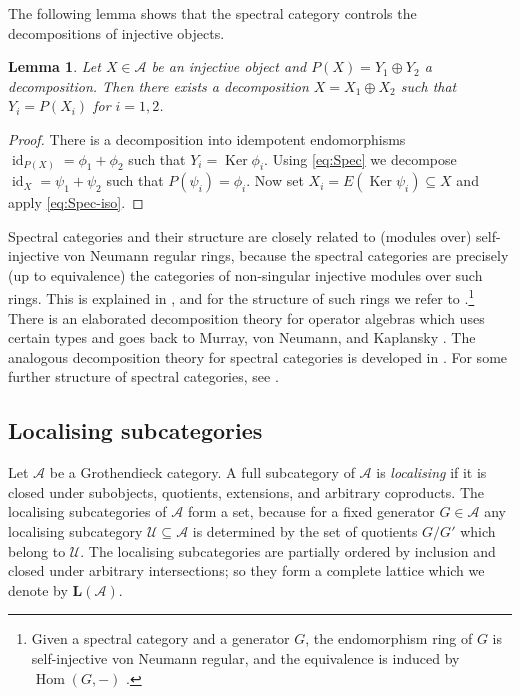 \documentclass[a4paper]{amsart}
\theoremstyle{plain}
\newtheorem{lem}[thm]{Lemma}
\theoremstyle{definition}
\theoremstyle{remark}
\numberwithin{equation}{section}
\newcommand{\Hom}{\operatorname{Hom}}
\newcommand{\id}{\operatorname{id}}
\newcommand{\Ker}{\operatorname{Ker}}
\def\A{\mathcal A}
\def\U{\mathcal U}
\def\bfL{\mathbf L}
\def\p{\phi}
\begin{document}
The following lemma shows that the spectral category controls the
decompositions of injective objects.

\begin{lem}\label{le:spec-decomp-inj}
  Let $X\in\A$ be an injective object and $P(X)=Y_1\oplus Y_2$ a
  decomposition. Then there exists a decomposition $X=X_1\oplus X_2$
  such that $Y_i=P(X_i)$ for $i=1,2$.
\end{lem}
\begin{proof}
There is a decomposition into idempotent endomorphisms
$\id_{P(X)}=\p_1+\p_2$ such that $Y_i=\Ker\p_i$. Using \eqref{eq:Spec}
we decompose $\id_X=\psi_1+\psi_2$ such that $P(\psi_i)=\p_i$. Now set
$X_i=E(\Ker\psi_i)\subseteq X$ and apply \eqref{eq:Spec-iso}.
\end{proof}

Spectral categories and their structure are closely related to
(modules over) self-injective von Neumann regular rings, because the
spectral categories are precisely (up to equivalence) the categories
of non-singular injective modules over such rings.  This is explained
in \cite{GO1966,Ro1967}, and for the structure of such rings we refer
to \cite{Go1979}.\footnote{Given a spectral category and a
  generator $G$, the endomorphism ring of $G$ is self-injective von
  Neumann regular, and the equivalence is induced by $\Hom(G,-)$ \cite[Satz~2.1]{GO1966}.}
There is an elaborated decomposition theory for operator algebras
which uses certain types and goes back to Murray, von Neumann, and
Kaplansky \cite{Ka1951,MvN1936}. The analogous decomposition theory
for spectral categories is developed in \cite{GB1976,Ro1967}. For some
further structure of spectral categories, see \cite{Fa1983}.


\subsection*{Localising subcategories}

Let $\A$ be a Grothendieck category.  A full subcategory of $\A$ is
\emph{localising} if it is closed under subobjects, quotients,
extensions, and arbitrary coproducts. The localising subcategories of
$\A$ form a set, because for a fixed generator $G\in\A$ any localising
subcategory $\U\subseteq\A$ is determined by the set of quotients
$G/G'$ which belong to $\U$. The localising subcategories are
partially ordered by inclusion and closed under arbitrary
intersections; so they form a complete lattice which we denote by
$\bfL(\A)$.
\end{document}
